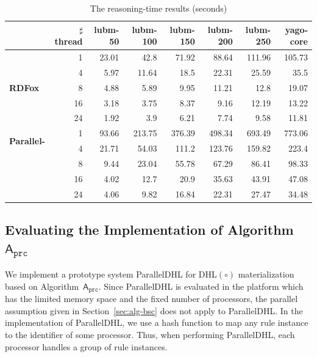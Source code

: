 \begin{table}
\centering
\caption{The reasoning-time results (seconds)}
\begin{tabular}{|l|r|r|r|r|r|r|r|}
\hline
&\small$\sharp$thread&lubm-50&lubm-100&lubm-150&lubm-200&lubm-250&yago-core\\
\hline
\multirow{5}{*}{ \small{\textbf{RDFox}}}&1&23.01&42.8&71.92&88.64&111.96&105.73\\
                    &4&5.97&11.64&18.5&22.31&25.59&35.5\\
                    &8&4.88&5.89&9.95&11.21&12.8&19.07\\
                    &16&3.18&3.75&8.37&9.16&12.19&13.22\\
                    &24&1.92&3.9&6.21&7.74&9.58&11.81\\
\hline
\multirow{2}{*}{ \small{\textbf{Parallel-}}}&1&93.66&213.75&376.39&498.34&693.49&773.06\\
\multirow{3}{*}{ \small{\textbf{DHL}}}&4&21.71&54.03&111.2&123.76&159.82&223.4\\
                    &8&9.44&23.04&55.78&67.29&86.41&98.33\\
                    &16&4.02&12.7&20.9&35.63&43.91&47.08\\
                    &24&4.06&9.82&16.84&22.31&27.47&34.48\\
\hline
\end{tabular}
\label{tab:result}
\end{table}


\subsection{Evaluating the Implementation of Algorithm~$\mathsf{A}_{\texttt{prc}}$}

We implement a prototype system ParallelDHL for DHL$(\circ)$ materialization
based on Algorithm~$\mathsf{A}_{\texttt{prc}}$. Since ParallelDHL is evaluated in the
platform which has the limited memory space and the fixed number of processors,
the parallel assumption given in Section~\ref{sec:alg-bsc} does not apply to ParallelDHL.
In the implementation of ParallelDHL, we use a hash function to map any rule instance
to the identifier of some processor. Thus, when performing ParallelDHL,
each processor handles a group of rule instances.

